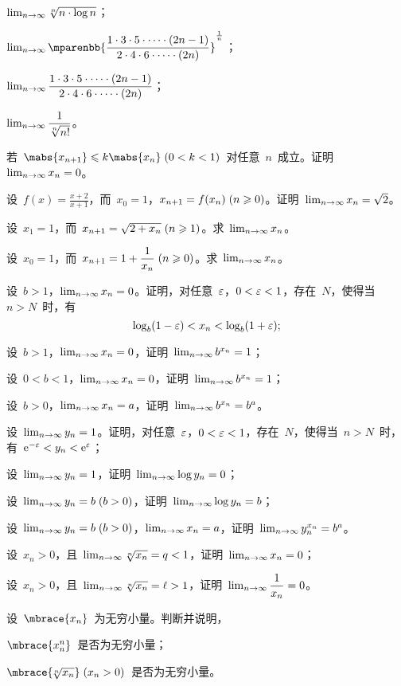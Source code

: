 \begin{exercise}
\begin{exlistcols}
  \item $\lim_{n\to\infty}\sqrt[n]{n\cdot\log n}$；
  \item $\lim_\ntoinf\mparenbb{\dfrac{1\cdot3\cdot5\cdot\dotsm\cdot(2n-1)}{2\cdot4\cdot6\cdot\dotsm\cdot(2n)}}^{\frac1n}$；
  \item $\lim_{n\to\infty}\dfrac{1\cdot3\cdot5\cdot\dotsm\cdot(2n-1)}{2\cdot4\cdot6\cdot\dotsm\cdot(2n)}$；
  \item $\lim_{n\to\infty}\dfrac1{\sqrt[n]{n!}}$。
\end{exlistcols}
\item 若~$\mabs{x_{n+1}}\leq k\mabs{x_n}\mcond{0<k<1}$~对任意~$n$~成立。证明~$\lim_{n\to\infty} x_n=0$。
\item 设~$f(x)=\frac{x+2}{x+1}$，而~$x_0=1$，$x_{n+1}=f(x_n)\mcond{n\geq0}$。证明~$\lim_{n\to\infty} x_n=\sqrt2$。
\item 设~$x_1=1$，而~$x_{n+1}=\sqrt{2+x_n}\mcond{n\geq1}$。求~$\lim_{n\to\infty} x_n$。
\item 设~$x_0=1$，而~$x_{n+1}=1+\dfrac1{x_n}\mcond{n\geq0}$。求~$\lim_{n\to\infty} x_n$。
\item\begin{exlist}
  \item 设~$b>1$，$\lim_{n\to\infty} x_n=0$。证明，对任意~$\varepsilon$，$0<\varepsilon<1$，存在~$N$，使得当~$n>N$~时，有
  \[
    \log_b(1-\varepsilon)<x_n<\log_b(1+\varepsilon);
  \]
  \item 设~$b>1$，$\lim_{n\to\infty} x_n=0$，证明~$\lim_{n\to\infty} b^{x_n}=1$；
  \item 设~$0<b<1$，$\lim_{n\to\infty} x_n=0$，证明~$\lim_{n\to\infty} b^{x_n}=1$；
  \item 设~$b>0$，$\lim_{n\to\infty} x_n=a$，证明~$\lim_{n\to\infty} b^{x_n}=b^a$。
\end{exlist}
\item\begin{exlist}
  \item 设~$\lim_{n\to\infty} y_n=1$。证明，对任意~$\varepsilon$，$0<\varepsilon<1$，存在~$N$，使得当~$n>N$~时，有~$\mathrm e^{-\varepsilon}<y_n<\mathrm e^\varepsilon$；
  \item 设~$\lim_{n\to\infty} y_n=1$，证明~$\lim_{n\to\infty}\log y_n=0$；
  \item 设~$\lim_\ntoinf y_n=b\mcond{b>0}$，证明~$\lim_{n\to\infty}\log y_n=b$；
  \item 设~$\lim_\ntoinf y_n=b\mcond{b>0}$，$\lim_{n\to\infty} x_n=a$，证明~$\lim_{n\to\infty} y_n^{x_n}=b^a$。
\end{exlist}
\item\begin{exlist}
  \item 设~$x_n>0$，且~$\lim_{n\to\infty}\sqrt[n]{x_n}=q<1$，证明~$\lim_{n\to\infty} x_n=0$；
  \item 设~$x_n>0$，且~$\lim_{n\to\infty}\sqrt[n]{x_n}=\ell>1$，证明~$\lim_{n\to\infty}\dfrac1{x_n}=0$。
\end{exlist}
\item 设~$\mbrace{x_n}$~为无穷小量。判断并说明，
\begin{exlistcols}
  \item $\mbrace{x_n^n}$~是否为无穷小量；
  \item $\mbrace{\!\sqrt[n]{x_n}}\mcond{x_n>0}$~是否为无穷小量。
\end{exlistcols}
\end{exercise}


